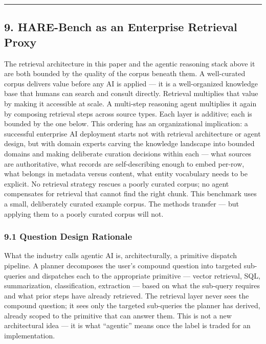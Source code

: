 \documentclass[
]{article}
\begin{document}
\begin{center}\rule{0.5\linewidth}{0.5pt}\end{center}

\subsection{9. HARE-Bench as an Enterprise Retrieval
Proxy}\label{hare-bench-as-an-enterprise-retrieval-proxy}

The retrieval architecture in this paper and the agentic reasoning stack
above it are both bounded by the quality of the corpus beneath them. A
well-curated corpus delivers value before any AI is applied --- it is a
well-organized knowledge base that humans can search and consult
directly. Retrieval multiplies that value by making it accessible at
scale. A multi-step reasoning agent multiplies it again by composing
retrieval steps across source types. Each layer is additive; each is
bounded by the one below. This ordering has an organizational
implication: a successful enterprise AI deployment starts not with
retrieval architecture or agent design, but with domain experts carving
the knowledge landscape into bounded domains and making deliberate
curation decisions within each --- what sources are authoritative, what
records are self-describing enough to embed per-row, what belongs in
metadata versus content, what entity vocabulary needs to be explicit. No
retrieval strategy rescues a poorly curated corpus; no agent compensates
for retrieval that cannot find the right chunk. This benchmark uses a
small, deliberately curated example corpus. The methods transfer --- but
applying them to a poorly curated corpus will not.

\subsubsection{9.1 Question Design
Rationale}\label{question-design-rationale}

What the industry calls agentic AI is, architecturally, a primitive
dispatch pipeline. A planner decomposes the user's compound question
into targeted sub-queries and dispatches each to the appropriate
primitive --- vector retrieval, SQL, summarization, classification,
extraction --- based on what the sub-query requires and what prior steps
have already retrieved. The retrieval layer never sees the compound
question; it sees only the targeted sub-queries the planner has derived,
already scoped to the primitive that can answer them. This is not a new
architectural idea --- it is what ``agentic'' means once the label is
traded for an implementation.
\end{document}
